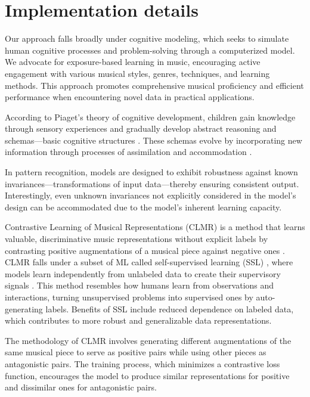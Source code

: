\section{Implementation details}

Our approach falls broadly under cognitive modeling, which seeks to simulate human cognitive processes and problem-solving through a computerized model. We advocate for exposure-based learning in music, encouraging active engagement with various musical styles, genres, techniques, and learning methods. This approach promotes comprehensive musical proficiency and efficient performance when encountering novel data in practical applications.

According to Piaget's theory of cognitive development, children gain knowledge through sensory experiences and gradually develop abstract reasoning and schemas—basic cognitive structures \cite{Huitt2003PiagetsDevelopment}. These schemas evolve by incorporating new information through processes of assimilation and accommodation \cite{audioselfsupsurvey}.

In pattern recognition, models are designed to exhibit robustness against known invariances—transformations of input data—thereby ensuring consistent output. Interestingly, even unknown invariances not explicitly considered in the model's design can be accommodated due to the model's inherent learning capacity.

Contrastive Learning of Musical Representations (CLMR) is a method that learns valuable, discriminative music representations without explicit labels by contrasting positive augmentations of a musical piece against negative ones \cite{CLMR2021}. CLMR falls under a subset of ML called self-supervised learning (SSL) \cite{Balestriero2023ALearning}, where models learn independently from unlabeled data to create their supervisory signals \cite{audioselfsupsurvey}. This method resembles how humans learn from observations and interactions, turning unsupervised problems into supervised ones by auto-generating labels. Benefits of SSL include reduced dependence on labeled data, which contributes to more robust and generalizable data representations.

The methodology of CLMR involves generating different augmentations of the same musical piece to serve as positive pairs while using other pieces as antagonistic pairs. The training process, which minimizes a contrastive loss function, encourages the model to produce similar representations for positive and dissimilar ones for antagonistic pairs.

